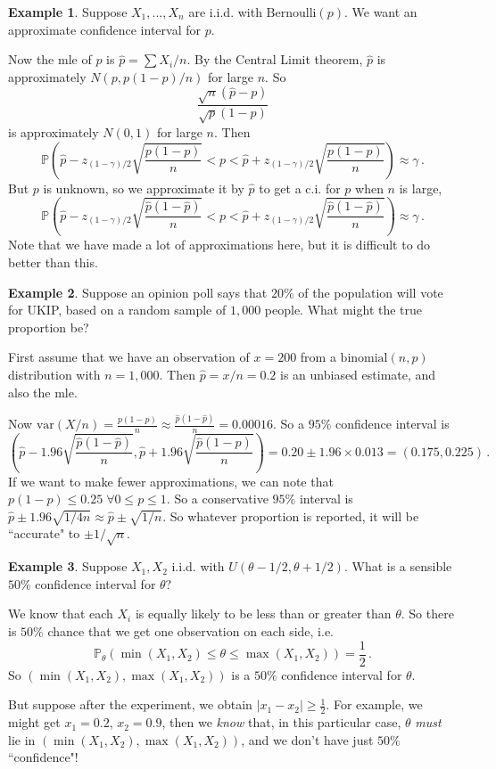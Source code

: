 \documentclass[a4paper,11pt]{article}
\theoremstyle{definition}
\newtheorem*{ex}{Example}
\numberwithin{equation}{section}
\begin{document}
\begin{ex}
Suppose $X_1,...,X_n$ are i.i.d. with $\text{Bernoulli}(p)$. We want an approximate confidence interval for $p$.

Now the mle of $p$ is $\hat{p}=\sum X_i/n$. By the Central Limit theorem, $\hat{p}$ is approximately $N(p,p(1-p)/n)$ for large $n$. So 
\[
\frac{\sqrt{n}(\hat{p}-p)}{\sqrt{p}(1-p)}
\]
is approximately $N(0,1)$ for large $n$. Then
\[
\mathbb{P}\left(\hat{p}-z_{(1-\gamma)/2}\sqrt{\frac{p(1-p)}{n}}<p<\hat{p}+z_{(1-\gamma)/2}\sqrt{\frac{p(1-p)}{n}}\right)\approx\gamma\,.
\]
But $p$ is unknown, so we approximate it by $\hat{p}$ to get a c.i. for $p$ when $n$ is large,
\[
\mathbb{P}\left(\hat{p}-z_{(1-\gamma)/2}\sqrt{\frac{\hat{p}(1-\hat{p})}{n}}<p<\hat{p}+z_{(1-\gamma)/2}\sqrt{\frac{\hat{p}(1-\hat{p})}{n}}\right)\approx\gamma\,.
\]
Note that we have made a lot of approximations here, but it is difficult to do better than this.
\end{ex}

\begin{ex}
Suppose an opinion poll says that $20\%$ of the population will vote for UKIP, based on a random sample of $1,000$ people. What might the true proportion be?

First assume that we have an observation of $x=200$ from a $\text{binomial}(n,p)$ distribution with $n=1,000$. Then $\hat{p}=x/n=0.2$ is an unbiased estimate, and also the mle.

Now $\text{var}(X/n)=\frac{p(1-p)}{n}\approx\frac{\hat{p}(1-\hat{p})}{n}=0.00016$. So a $95\%$ confidence interval is
\[
\left(\hat{p}-1.96\sqrt{\frac{\hat{p}(1-\hat{p})}{n}},\hat{p}+1.96\sqrt{\frac{\hat{p}(1-\hat{p})}{n}}\right)=0.20\pm1.96\times0.013=(0.175,0.225)\,.
\]
If we want to make fewer approximations, we can note that $p(1-p)\leq 0.25\;\forall0\leq p\leq 1$. So a conservative $95\%$ interval is $\hat{p}\pm1.96\sqrt{1/4n}\approx\hat{p}\pm\sqrt{1/n}$. So whatever proportion is reported, it will be ``accurate" to $\pm1/\sqrt{n}$.
\end{ex}

\begin{ex}
Suppose $X_1,X_2$ i.i.d. with $U(\theta-1/2,\theta+1/2)$. What is a sensible $50\%$ confidence interval for $\theta$?

We know that each $X_i$ is equally likely to be less than or greater than $\theta$. So there is $50\%$ chance that we get one observation on each side, i.e.
\[
\mathbb{P}_\theta(\min(X_1,X_2)\leq\theta\leq\max(X_1,X_2))=\frac{1}{2}\,.
\]
So $(\min(X_1,X_2),\max(X_1,X_2))$ is a $50\%$ confidence interval for $\theta$.

But suppose after the experiment, we obtain $|x_1-x_2|\geq\frac{1}{2}$. For example, we might get $x_1=0.2$, $x_2=0.9$, then we \emph{know} that, in this particular case, $\theta$ \emph{must} lie in $(\min(X_1,X_2),\max(X_1,X_2))$, and we don't have just $50\%$ ``confidence"!
\end{ex}
\end{document}
